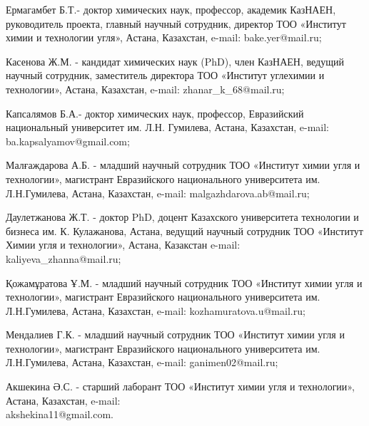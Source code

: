 \begin{info}
Ермагамбет Б.Т.- доктор химических наук, профессор, академик КазНАЕН,
руководитель проекта, главный научный сотрудник, директор ТОО «Институт
химии и технологии угля», Астана, Казахстан, e-mail:
bake.yer@mail.ru; 

Касенова Ж.М. - кандидат химических наук (PhD), член КазНАЕН, ведущий
научный сотрудник, заместитель директора ТОО «Институт углехимии и
технологии», Астана, Казахстан, e-mail: zhanar\_k\_68@mail.ru;

Капсалямов Б.А.- доктор химических наук, профессор, Евразийский
национальный университет им. Л.Н. Гумилева, Астана, Казахстан, e-mail:
ba.kapsalyamov@gmail.com;

Малғаждарова А.Б. - младший научный сотрудник ТОО «Институт химии угля и
технологии», магистрант Евразийского национального университета им.
Л.Н.Гумилева, Астана, Казахстан, e-mail: malgazhdarova.ab@mail.ru;

Даулетжанова Ж.Т. - доктор PhD, доцент Казахского университета
технологии и бизнеса им. К. Кулажанова, Астана, ведущий научный
сотрудник ТОО «Институт Химии угля и технологии», Астана, Казакстан
e-mail: \\kaliyeva\_zhanna@mail.ru;

Қожамұратова Ұ.М. - младший научный сотрудник ТОО «Институт химии угля и
технологии», магистрант Евразийского национального университета им.
Л.Н.Гумилева, Астана, Казахстан, e-mail: kozhamuratova.u@mail.ru;

Мендалиев Г.К. - младший научный сотрудник ТОО «Институт химии угля и
технологии», магистрант Евразийского национального университета им.
Л.Н.Гумилева, Астана, Казахстан, e-mail: ganimen02@mail.ru;

Акшекина Ә.С. - старший лаборант ТОО «Институт химии угля и технологии»,
Астана, Казахстан, e-mail: \\akshekina11@gmail.com.
\end{info}
